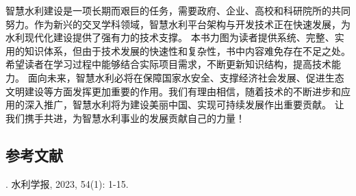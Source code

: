 智慧水利建设是一项长期而艰巨的任务，需要政府、企业、高校和科研院所的共同努力。作为新兴的交叉学科领域，智慧水利平台架构与开发技术正在快速发展，为水利现代化建设提供了强有力的技术支撑。
本书力图为读者提供系统、完整、实用的知识体系，但由于技术发展的快速性和复杂性，书中内容难免存在不足之处。希望读者在学习过程中能够结合实际项目需求，不断更新知识结构，提高技术能力。
面向未来，智慧水利必将在保障国家水安全、支撑经济社会发展、促进生态文明建设等方面发挥更加重要的作用。我们有理由相信，随着技术的不断进步和应用的深入推广，智慧水利将为建设美丽中国、实现可持续发展作出重要贡献。
让我们携手共进，为智慧水利事业的发展贡献自己的力量！ \subsection{参考文献}\label{ux53c2ux8003ux6587ux732e} . 水利学报, 2023, 54(1): 1-15.
